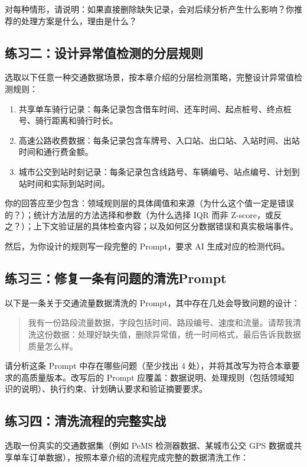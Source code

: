 对每种情形，请说明：如果直接删除缺失记录，会对后续分析产生什么影响？你推荐的处理方案是什么，理由是什么？

\subsection*{练习二：设计异常值检测的分层规则}

选取以下任意一种交通数据场景，按本章介绍的分层检测策略，完整设计异常值检测规则：

\begin{enumerate}
  \item 共享单车骑行记录：每条记录包含借车时间、还车时间、起点桩号、终点桩号、骑行距离和骑行时长。
  \item 高速公路收费数据：每条记录包含车牌号、入口站、出口站、入站时间、出站时间和通行费金额。
  \item 城市公交到站时刻记录：每条记录包含线路号、车辆编号、站点编号、计划到站时间和实际到站时间。
\end{enumerate}

你的回答应至少包含：领域规则层的具体阈值和来源（为什么这个值一定是错误的？）；统计方法层的方法选择和参数（为什么选择 IQR 而非 Z-score，或反之？）；上下文验证层的具体检查内容；以及如何区分数据错误和真实极端事件。

然后，为你设计的规则写一段完整的 Prompt，要求 AI 生成对应的检测代码。

\subsection*{练习三：修复一条有问题的清洗Prompt}

以下是一条关于交通流量数据清洗的 Prompt，其中存在几处会导致问题的设计：

\begin{quote}
我有一份路段流量数据，字段包括时间、路段编号、速度和流量。请帮我清洗这份数据：处理好缺失值，删除异常值，统一时间格式，最后告诉我数据质量怎么样。
\end{quote}

请分析这条 Prompt 中存在哪些问题（至少找出 4 处），并将其改写为符合本章要求的高质量版本。改写后的 Prompt 应覆盖：数据说明、处理规则（包括领域知识的说明）、执行约束、计划确认要求和验证摘要要求。

\subsection*{练习四：清洗流程的完整实战}

选取一份真实的交通数据集（例如 PeMS 检测器数据、某城市公交 GPS 数据或共享单车订单数据），按照本章介绍的流程完成完整的数据清洗工作：

